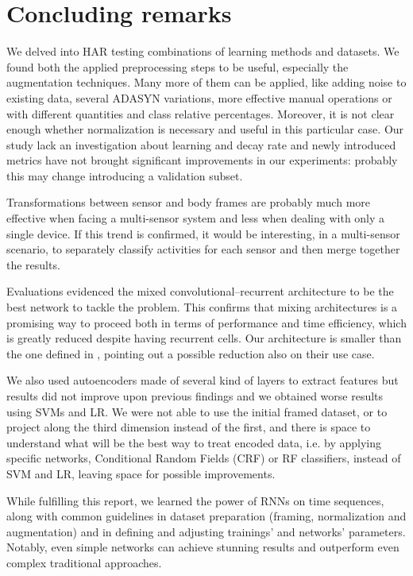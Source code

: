 \section{Concluding remarks}
\label{sec:conclusions}

We delved into HAR testing combinations of learning methods and datasets.
We found both the applied preprocessing steps %
to be useful, especially the augmentation techniques.
Many more of them can be applied, like adding noise to existing data, several ADASYN variations, more effective manual operations or with different quantities and class relative percentages.
Moreover, it is not clear enough whether normalization is necessary and useful in this particular case.
Our study lack an investigation about learning and decay rate and newly introduced metrics have not brought significant improvements in our experiments: probably this may change introducing a validation subset.

Transformations between sensor and body frames are probably much more effective when facing a multi-sensor system and less when dealing with only a single device.
If this trend is confirmed, it would be interesting, in a multi-sensor scenario, to separately classify activities for each sensor and then merge together the results.

Evaluations evidenced the mixed convolutional--recurrent architecture to be the best network to tackle the problem.
This confirms that mixing architectures is a promising way to proceed both in terms of performance and time efficiency, which is greatly reduced despite having recurrent cells.
Our architecture is smaller than the one defined in \cite{Ordonez-CNN-LSTM}, pointing out a possible reduction also on their use case.%

We also used autoencoders made of several kind of layers to extract features but results did not improve upon previous findings and we obtained worse results using SVMs and LR.
We were not able to use the initial framed dataset, or to project along the third dimension instead of the first, and there is space to understand what will be the best way to treat encoded data, i.e. by applying specific networks, Conditional Random Fields (CRF) or RF classifiers, instead of SVM and LR, leaving space for possible improvements.

While fulfilling this report, we learned the power of RNNs on time sequences, along with common guidelines in dataset preparation (framing, normalization and augmentation) and in defining and adjusting trainings' and networks' parameters.
Notably, even simple networks can achieve stunning results and outperform even complex traditional approaches.%
